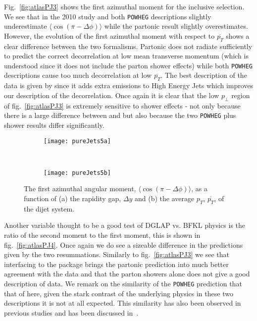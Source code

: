 	Fig.~\eqref{fig:atlasPJ3} shows the first azimuthal moment for the inclusive selection.
	We see that in the 2010 study \HEJA and both \texttt{POWHEG} descriptions slightly
	underestimate $\langle\cos(\pi-\Delta\phi)\rangle$ while the partonic \HEJ result slightly
	overestimates.  However, the evolution of the first azimuthal moment with respect to
	$\overline{p_T}$ shows a clear difference between the two formalisms.  Partonic \HEJ does not
	radiate sufficiently to predict the correct decorrelation at low mean transverse momentum
	(which is understood since it does not include the parton shower effects) while both
	\texttt{POWHEG} descriptions cause too much decorrelation at low $\overline{p_T}$.
	The best description of the data is given by \HEJA since it adds extra emissions to High
	Energy Jets which improves our description of the decorrelation.  Once again it is clear that the low
	$p_\perp$ region of fig.~\eqref{fig:atlasPJ3} is extremely sensitive to shower effects - not
	only because there is a large difference between \HEJ and \HEJA but also because the two
	\texttt{POWHEG} plus shower results differ significantly.

	\begin{figure}[bth]
		\centering
		\begin{subfigure}[b]{0.48\textwidth}
			\texttt{[image: pureJets5a]}
			\caption{}
			\label{fig:}
		\end{subfigure}
		~
		\begin{subfigure}[b]{0.48\textwidth}
			\texttt{[image: pureJets5b]}
			\caption{}
			\label{fig:}
		\end{subfigure}
		\caption{The first azimuthal angular moment, $\langle \cos(\pi-\Delta\phi)\rangle$,
		as a function of (a) the rapidity gap, $\Delta y$ and (b) the average $p_T$,
		$\overline{p_T}$, of the dijet system.}
		\label{fig:atlasPJ3}
	\end{figure}

	Another variable thought to be a good test of DGLAP vs. BFKL physics is the ratio of
	the second moment to the first moment, this is shown in fig.~\eqref{fig:atlasPJ4}.  Once
	again we do see a sizeable difference in the predictions given by the two resummations.
	Similarly to fig.~\eqref{fig:atlasPJ3} we see that interfacing to the \ARIADNE package
	brings the partonic \HEJ prediction into much better agreement with the data and that the
	parton showers alone does not give a good description of data.  We remark on the similarity
	of the \texttt{POWHEG} prediction that that of \HEJA here, given the stark contrast of the
	underlying physics in these two descriptions it is not at all expected.  This similarity
	has also been observed in previous studies and has been discussed in~\cite{Alioli:2012tp}.

